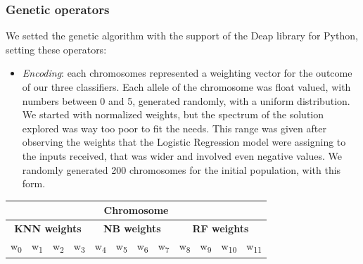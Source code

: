 \subsubsection{Genetic operators}

We setted the genetic algorithm with the support of the Deap library for Python, setting these operators:
\begin{itemize}
	\item[\PencilRight]\textit{Encoding}: each chromosomes represented a weighting vector for the outcome of our three classifiers. Each allele of the chromosome was float valued, with numbers between 0 and 5, generated randomly, with a uniform distribution. We started with normalized weights, but the spectrum of the solution explored was way too poor to fit the needs.
	This range was given after observing the weights that the Logistic Regression model were assigning to the inputs received, that was wider and involved even negative values.
	We randomly generated 200 chromosomes for the initial population, with this form.
\end{itemize}
\begin{center}
	\begin{tabular}{@{}c|c|c|c|c|c|c|c|c|c|c|c@{}}
		\multicolumn{12}{c}{Chromosome} \\
		\hline
		\multicolumn{4}{c|}{\textbf{KNN weights}} & 
		\multicolumn{4}{c|}{\textbf{NB weights}} & 
		\multicolumn{4}{c}{\textbf{RF weights}}\\
		\hline
		\multicolumn{1}{c|}{w\textsubscript{0}} &
		\multicolumn{1}{c|}{w\textsubscript{1}} &
		\multicolumn{1}{c|}{w\textsubscript{2}} &
		\multicolumn{1}{c|}{w\textsubscript{3}} &
		\multicolumn{1}{c|}{w\textsubscript{4}} &
		\multicolumn{1}{c|}{w\textsubscript{5}} &
		\multicolumn{1}{c|}{w\textsubscript{6}} &
		\multicolumn{1}{c|}{w\textsubscript{7}} &	
		\multicolumn{1}{c|}{w\textsubscript{8}} &
		\multicolumn{1}{c|}{w\textsubscript{9}} &
		\multicolumn{1}{c|}{w\textsubscript{10}} &
		\multicolumn{1}{c}{w\textsubscript{11}}\\
		\hline
	\end{tabular}
\end{center}
